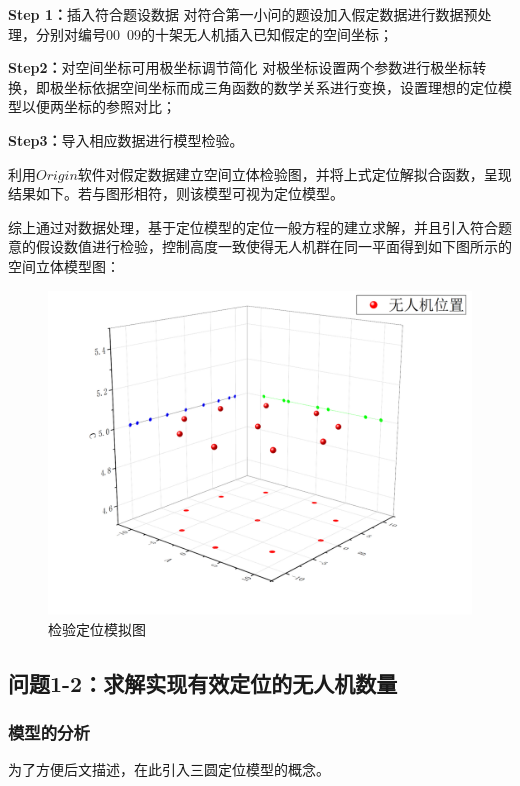 \textbf{Step 1：}插入符合题设数据
对符合第一小问的题设加入假定数据进行数据预处理，分别对编号00~09的十架无人机插入已知假定的空间坐标；

\textbf{Step2：}对空间坐标可用极坐标调节简化
对极坐标设置两个参数进行极坐标转换，即极坐标依据空间坐标而成三角函数的数学关系进行变换，设置理想的定位模型以便两坐标的参照对比；\cite{wangnengbinShujukuxitongjiaocheng}

\textbf{Step3：}导入相应数据进行模型检验。

利用$Origin$软件对假定数据建立空间立体检验图，并将上式定位解拟合函数，呈现结果如下。若与图形相符，则该模型可视为定位模型。

综上通过对数据处理，基于定位模型的定位一般方程的建立求解，并且引入符合题意的假设数值进行检验，控制高度一致使得无人机群在同一平面得到如下图所示的空间立体模型图：


\begin{figure}
    \centering
    \includegraphics{res/PositionTheModelStereogram.png}
    \caption{检验定位模拟图}
\end{figure}


\subsection{问题1-2：求解实现有效定位的无人机数量}

\subsubsection{模型的分析}

为了方便后文描述，在此引入三圆定位模型的概念。

